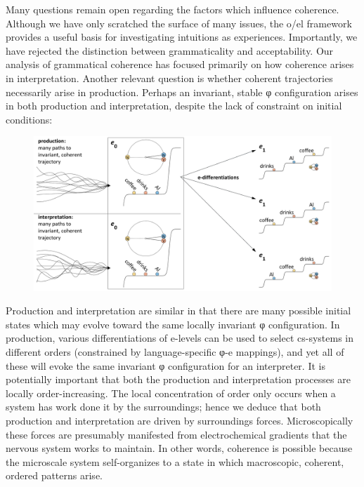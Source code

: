   Many questions remain open regarding the factors which influence coherence. Although we have only scratched the surface of many issues, the o/el framework provides a useful basis for investigating intuitions as experiences. Importantly, we have rejected the distinction between grammaticality and acceptability. Our analysis of grammatical coherence has focused primarily on how coherence arises in interpretation. Another relevant question is whether coherent trajectories necessarily arise in production. Perhaps an invariant, stable φ configuration arises in both production and interpretation, despite the lack of constraint on initial conditions:

  
\begin{figure}
\includegraphics[width=\textwidth]{figures/Tilsen-img135.png}
\caption{\missingcaption}
\label{fig:}
\end{figure}
 

  Production and interpretation are similar in that there are many possible initial states which may evolve toward the same locally invariant φ configuration. In production, various differentiations of e-levels can be used to select cs-systems in different orders (constrained by language-specific φ-e mappings), and yet all of these will evoke the same invariant φ configuration for an interpreter. It is potentially important that both the production and interpretation processes are locally order-increasing. The local concentration of order only occurs when a system has work done it by the surroundings; hence we deduce that both production and interpretation are driven by surroundings forces. Microscopically these forces are presumably manifested from electrochemical gradients that the nervous system works to maintain. In other words, coherence is possible because the microscale system self-organizes to a state in which macroscopic, coherent, ordered patterns arise.

